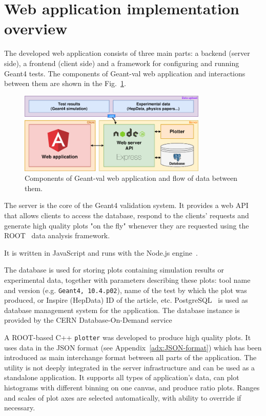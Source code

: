 \section{Web application implementation overview}
\label{sec-webapplication}

The developed web application consists of three main parts: a backend (server side), a frontend (client side) and a framework for configuring and running Geant4 tests. The components of \textsf{Geant-val} web application and interactions between them are shown in the Fig.~\ref{fig:dataflow}.

\begin{figure}[h]
    \centering
    \includegraphics[width=0.8\textwidth,clip]{schema.png}
    \caption{Components of \textsf{Geant-val} web application and flow of data between them.}
    \label{fig:dataflow}
\end{figure}

The server is the core of the Geant4 validation system. It provides a web API that allows clients to access the database, respond to the clients' requests and generate high quality plots "on the fly" whenever they are requested using the ROOT~\cite{ROOT} data analysis framework.

It is written in JavaScript and runs with the Node.js engine~\cite{NodeJS}. 

 The database is used for storing plots containing simulation results or experimental data, together with parameters describing these plots: tool name and version (e.g. \texttt{Geant4, 10.4.p02}), name of the test by which the plot was produced, or Inspire (HepData) ID of the article, etc. PostgreSQL~\cite{Postgre} is used as database management system for the application. The database instance is provided by the CERN Database-On-Demand service  %


 A ROOT-based C++ {\tt plotter} was developed to produce high quality plots. It uses data in the JSON format (see Appendix~\ref{adx:JSON-format}) which has been introduced as main interchange format between all parts of the application. The utility is not deeply integrated in the server infrastructure and can be used as a standalone application. It supports all types of application's data, can plot histograms with different binning on one canvas, and produce ratio plots. Ranges and scales of plot axes are selected automatically, with ability to override if necessary. %

